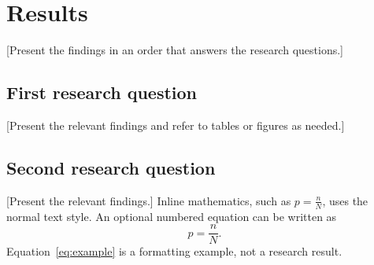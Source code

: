 \chapter{Results}
[Present the findings in an order that answers the research questions.]

\section{First research question}
[Present the relevant findings and refer to tables or figures as needed.]

\section{Second research question}
[Present the relevant findings.]
Inline mathematics, such as \(p = \frac{n}{N}\), uses the normal text style.
An optional numbered equation can be written as
\begin{equation}
  p = \frac{n}{N}.
  \label{eq:example}
\end{equation}
Equation~\ref{eq:example} is a formatting example, not a research result.
